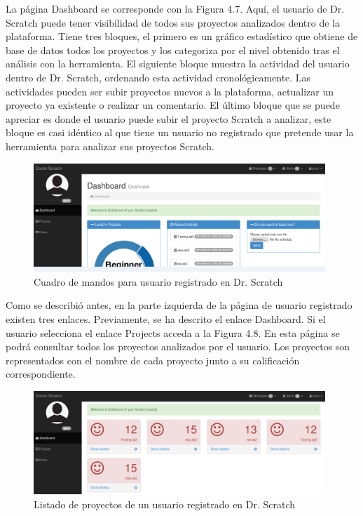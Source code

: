 \documentclass[a4paper, 12pt]{book}
\begin{document}
La página Dashboard se corresponde con la Figura 4.7. Aquí, el usuario de 
Dr. Scratch puede tener visibilidad de todos sus proyectos analizados dentro de la 
plataforma. Tiene tres bloques, el primero es un gráfico estadístico que obtiene de 
base de datos todos los proyectos y los categoriza por el nivel obtenido tras el 
análisis con la herramienta. El siguiente bloque muestra la actividad del usuario 
dentro de Dr. Scratch, ordenando esta actividad cronológicamente. Las actividades
pueden ser subir proyectos nuevos a la plataforma, actualizar un proyecto ya 
existente o realizar un comentario. El último bloque que se puede apreciar es donde
el usuario puede subir el proyecto Scratch a analizar, este bloque es casi 
idéntico al que tiene un usuario no registrado que pretende usar la herramienta 
para analizar sus proyectos Scratch. \\ 

\begin{figure}
	\graphicspath{{img/}}
  \includegraphics[bb=0 0 800 600, width=11cm, keepaspectratio]{dashboardprincipal.png}
	\caption{Cuadro de mandos para usuario registrado en Dr. Scratch}
  \label{figura:foro_hilos}
\end{figure}

Como se describió antes, en la parte izquierda de la página de usuario registrado 
existen tres enlaces. Previamente, se ha descrito el enlace Dashboard. Si el usuario
selecciona el enlace Projects acceda a la Figura 4.8. En esta página se podrá 
consultar todos los proyectos analizados por el usuario. Los proyectos son representados
con el nombre de cada proyecto junto a su calificación correspondiente.


\begin{figure}
	\graphicspath{{img/}}
  \includegraphics[bb=0 0 800 600, width=11cm, keepaspectratio]{proyectos.png}
	\caption{Listado de proyectos de un usuario registrado en Dr. Scratch}
  \label{figura:foro_hilos}
\end{figure}
\end{document}

